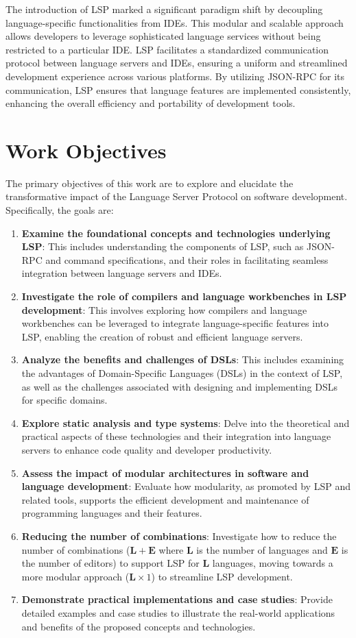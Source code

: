 \documentclass{adapt-lab}
\begin{document}
The introduction of LSP marked a significant paradigm shift by decoupling language-specific functionalities from IDEs. This modular and scalable approach allows developers to leverage sophisticated language services without being restricted to a particular IDE. LSP facilitates a standardized communication protocol between language servers and IDEs, ensuring a uniform and streamlined development experience across various platforms. By utilizing JSON-RPC for its communication, LSP ensures that language features are implemented consistently, enhancing the overall efficiency and portability of development tools.

\section{Work Objectives}

The primary objectives of this work are to explore and elucidate the transformative impact of the Language Server Protocol on software development. Specifically, the goals are:
\begin{enumerate}
    \item \textbf{Examine the foundational concepts and technologies underlying LSP}: This includes understanding the components of LSP, such as JSON-RPC and command specifications, and their roles in facilitating seamless integration between language servers and IDEs.
    \item \textbf{Investigate the role of compilers and language workbenches in LSP development}: This involves exploring how compilers and language workbenches can be leveraged to integrate language-specific features into LSP, enabling the creation of robust and efficient language servers.
    \item \textbf{Analyze the benefits and challenges of DSLs}: This includes examining the advantages of Domain-Specific Languages (DSLs) in the context of LSP, as well as the challenges associated with designing and implementing DSLs for specific domains.
    \item \textbf{Explore static analysis and type systems}: Delve into the theoretical and practical aspects of these technologies and their integration into language servers to enhance code quality and developer productivity.
    \item \textbf{Assess the impact of modular architectures in software and language development}: Evaluate how modularity, as promoted by LSP and related tools, supports the efficient development and maintenance of programming languages and their features.
    \item \textbf{Reducing the number of combinations}: Investigate how to reduce the number of combinations ($\mathbf{L} + \mathbf{E}$ where $\mathbf{L}$ is the number of languages and $\mathbf{E}$ is the number of editors) to support LSP for $\mathbf{L}$ languages, moving towards a more modular approach ($\mathbf{L} \times 1$) to streamline LSP development.
    \item \textbf{Demonstrate practical implementations and case studies}: Provide detailed examples and case studies to illustrate the real-world applications and benefits of the proposed concepts and technologies.
\end{enumerate}
\end{document}

